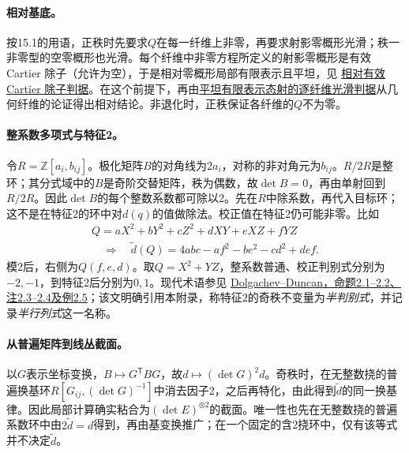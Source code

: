 \paragraph{相对基底。}
按15.1的用语，正秩时先要求$Q$在每一纤维上非零，再要求射影零概形光滑；秩一非零型的空零概形也光滑。每个纤维中非零方程所定义的射影零概形是有效 Cartier 除子（允许为空），于是相对零概形局部有限表示且平坦，见 \href{https://stacks.math.columbia.edu/tag/062Y}{相对有效 Cartier 除子判据}。在这个前提下，再由\href{https://stacks.math.columbia.edu/tag/01V8}{平坦有限表示态射的逐纤维光滑判据}从几何纤维的论证得出相对结论。非退化时，正秩保证各纤维的$Q$不为零。
\par\endgroup

\begingroup
\def\OO{\mathcal O}
\def\Sym{\operatorname{Sym}}
\hypertarget{audit:L18-070}{}

\paragraph{整系数多项式与特征2。}
令$R=\mathbb Z[a_i,b_{ij}]$。极化矩阵$B$的对角线为$2a_i$，对称的非对角元为$b_{ij}$。$R/2R$是整环；其分式域中的$B$是奇阶交替矩阵，秩为偶数，故$\det B=0$，再由单射回到$R/2R$。因此$\det B$的每个整数系数都可除以2。先在$R$中除系数，再代入目标环；这不是在特征2的环中对$d(q)$的值做除法。校正值在特征2仍可能非零。比如
\[
\begin{gathered}
Q=aX^2+bY^2+cZ^2+dXY+eXZ+fYZ\\
\quad\Longrightarrow\quad
\widetilde d(Q)=4abc-af^2-be^2-cd^2+def .
\end{gathered}
\]
模2后，右侧为$Q(f,e,d)$。取$Q=X^2+YZ$，整系数普通、校正判别式分别为$-2,-1$，到特征2后分别为$0,1$。现代术语参见 \href{https://doi.org/10.2140/ant.2018.12.99}{Dolgachev--Duncan，命题2.1--2.2、注2.3--2.4及例2.5}；该文明确引用本附录，称特征2的奇秩不变量为\emph{半判别式}，并记录\emph{半行列式}这一名称。

\paragraph{从普遍矩阵到线丛截面。}
以$G$表示坐标变换，$B\mapsto G^{\mathsf T}BG$，故$d\mapsto(\det G)^2d$。奇秩时，在无整数挠的普遍换基环$R[G_{ij},(\det G)^{-1}]$中消去因子2，之后再特化，由此得到$\widetilde d$的同一换基律。因此局部计算确实粘合为$(\det E)^{\otimes2}$的截面。唯一性也先在无整数挠的普遍系数环中由$2\widetilde d=d$得到，再由基变换推广；在一个固定的含2挠环中，仅有该等式并不决定$\widetilde d$。

